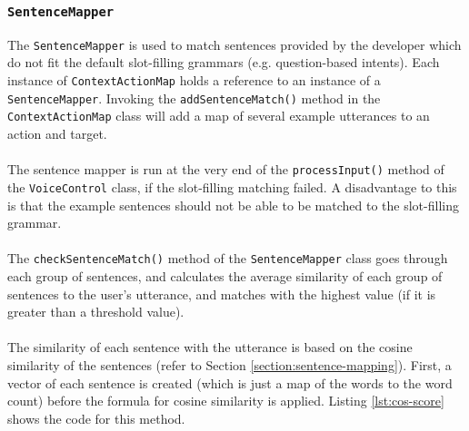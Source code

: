 \documentclass[11pt]{article}
\begin{document}
\subsubsection{\texttt{SentenceMapper}}

The \texttt{SentenceMapper} is used to match sentences provided by the developer which do not fit the default slot-filling grammars (e.g. question-based intents). Each instance of \texttt{ContextActionMap} holds a reference to an instance of a \texttt{SentenceMapper}. Invoking the \texttt{addSentenceMatch()} method in the \texttt{ContextActionMap} class will add a map of several example utterances to an action and target.
\\
\\
The sentence mapper is run at the very end of the \texttt{processInput()} method of the \texttt{VoiceControl} class, if the slot-filling matching failed. A disadvantage to this is that the example sentences should not be able to be matched to the slot-filling grammar.
\\
\\
The \texttt{checkSentenceMatch()} method of the \texttt{SentenceMapper} class goes through each group of sentences, and calculates the average similarity of each group of sentences to the user's utterance, and matches with the highest value (if it is greater than a threshold value).
\\
\\
The similarity of each sentence with the utterance is based on the cosine similarity of the sentences (refer to Section \ref{section:sentence-mapping}). First, a vector of each sentence is created (which is just a map of the words to the word count) before the formula for cosine similarity is applied. Listing \ref{lst:cos-score} shows the code for this method.
\end{document}
